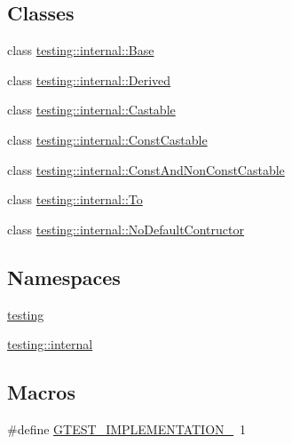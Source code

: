 \subsection*{Classes}
\begin{DoxyCompactItemize}
\item 
class \hyperlink{classtesting_1_1internal_1_1Base}{testing\+::internal\+::\+Base}
\item 
class \hyperlink{classtesting_1_1internal_1_1Derived}{testing\+::internal\+::\+Derived}
\item 
class \hyperlink{classtesting_1_1internal_1_1Castable}{testing\+::internal\+::\+Castable}
\item 
class \hyperlink{classtesting_1_1internal_1_1ConstCastable}{testing\+::internal\+::\+Const\+Castable}
\item 
class \hyperlink{classtesting_1_1internal_1_1ConstAndNonConstCastable}{testing\+::internal\+::\+Const\+And\+Non\+Const\+Castable}
\item 
class \hyperlink{classtesting_1_1internal_1_1To}{testing\+::internal\+::\+To}
\item 
class \hyperlink{classtesting_1_1internal_1_1NoDefaultContructor}{testing\+::internal\+::\+No\+Default\+Contructor}
\end{DoxyCompactItemize}
\subsection*{Namespaces}
\begin{DoxyCompactItemize}
\item 
 \hyperlink{namespacetesting}{testing}
\item 
 \hyperlink{namespacetesting_1_1internal}{testing\+::internal}
\end{DoxyCompactItemize}
\subsection*{Macros}
\begin{DoxyCompactItemize}
\item 
\#define \hyperlink{gtest-port__test_8cc_a83bd232fd1077579fada92c31bb7469f}{G\+T\+E\+S\+T\+\_\+\+I\+M\+P\+L\+E\+M\+E\+N\+T\+A\+T\+I\+O\+N\+\_\+}~1
\end{DoxyCompactItemize}

